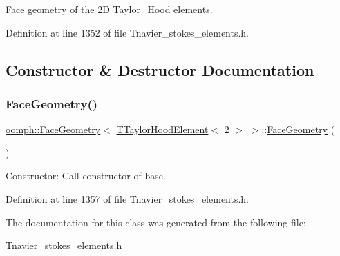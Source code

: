 Face geometry of the 2D Taylor\+\_\+\+Hood elements. 

Definition at line 1352 of file Tnavier\+\_\+stokes\+\_\+elements.\+h.



\subsection{Constructor \& Destructor Documentation}
\mbox{\label{classoomph_1_1FaceGeometry_3_01TTaylorHoodElement_3_012_01_4_01_4_a8d123f43002e6d961cdb8faffb671d4a}} 
\subsubsection{\texorpdfstring{Face\+Geometry()}{FaceGeometry()}}
{\footnotesize\ttfamily \hyperlink{classoomph_1_1FaceGeometry}{oomph\+::\+Face\+Geometry}$<$ \hyperlink{classoomph_1_1TTaylorHoodElement}{T\+Taylor\+Hood\+Element}$<$ 2 $>$ $>$\+::\hyperlink{classoomph_1_1FaceGeometry}{Face\+Geometry} (\begin{DoxyParamCaption}{ }\end{DoxyParamCaption})\hspace{0.3cm}{\ttfamily [inline]}}



Constructor\+: Call constructor of base. 



Definition at line 1357 of file Tnavier\+\_\+stokes\+\_\+elements.\+h.



The documentation for this class was generated from the following file\+:\begin{DoxyCompactItemize}
\item 
\hyperlink{Tnavier__stokes__elements_8h}{Tnavier\+\_\+stokes\+\_\+elements.\+h}\end{DoxyCompactItemize}

